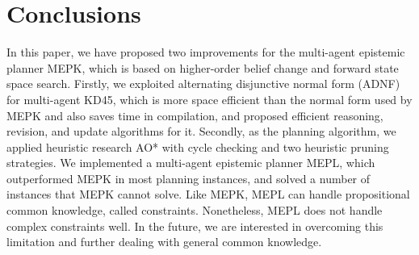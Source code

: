 \documentclass{llncs}
\begin{document}
\section{Conclusions}
In this paper, we have proposed two improvements for the multi-agent epistemic planner MEPK, which is based on higher-order belief change and forward state space search. Firstly,
we exploited alternating disjunctive normal form (ADNF) for multi-agent KD45, which is more space efficient than the normal form used by MEPK and also saves time in compilation, and proposed efficient reasoning, revision, and update algorithms for it. Secondly, as the planning algorithm, we applied heuristic research AO* with cycle checking and two heuristic pruning strategies.
We implemented a multi-agent epistemic planner MEPL, which outperformed MEPK in most planning instances, and solved a number of instances that MEPK cannot solve. Like MEPK, MEPL can handle propositional common knowledge, called constraints.
Nonetheless, MEPL does not handle complex constraints well. In the future, we are interested in overcoming this limitation and further dealing with general common knowledge.




\end{document}
